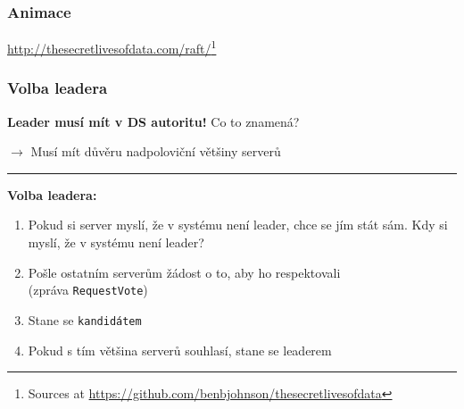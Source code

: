 \documentclass[usenames,dvipsnames,9pt]{beamer}
\begin{document}
\begin{frame}
  \frametitle{Animace}
  \begin{center}
      \url{http://thesecretlivesofdata.com/raft/}\footnote{Sources at \url{https://github.com/benbjohnson/thesecretlivesofdata}}
  \end{center}
\end{frame}

\begin{frame}
  \frametitle{Volba leadera}

  {\Large \textbf{\faWarning \hspace{3pt} Leader musí mít v DS autoritu!} \hfill Co to znamená?}

  \pause\hspace{20pt} $\rightarrow$ Musí mít důvěru nadpoloviční většiny serverů

  \vspace{2em}\hrule\vspace{2em}

  \textbf{Volba leadera:}
  \begin{enumerate}
    \item Pokud si server myslí, že v systému není leader, chce se jím stát sám.
          \hfill Kdy si myslí, že v systému není leader?
    \pause
    \item Pošle ostatním serverům žádost o to, aby ho respektovali \\
          (zpráva \texttt{RequestVote})

    \item Stane se \texttt{kandidátem}

    \pause
    \item Pokud s tím většina serverů souhlasí, stane se leaderem
  \end{enumerate}
\end{frame}
\end{document}

